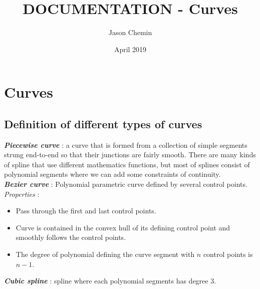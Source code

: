 \documentclass{article}
\title{DOCUMENTATION - Curves}
\author{Jason Chemin}
\date{April 2019}
\begin{document}
\newcommand{\commentt}[2]{\textcolor{#1}{\textbf{\textit{[#2]}}}}       %
\newcommand{\nmnote}[1]{\commentt{red}{NM: #1}}
\newcommand{\stn}[1]{\commentt{blue}{ST: #1}}

\maketitle

\tableofcontents
\newpage

\section{Curves}
\subsection{Definition of different types of curves}


    \noindent
    \textbf{\textit{Piecewise curve}} : a curve that is formed from a collection of simple segments strung end-to-end so that their junctions are fairly smooth. There are many kinds of spline that use different mathematics functions, but most of splines consist of polynomial segments where we can add some constraints of continuity.\\

    \noindent
    \textbf{\textit{Bezier curve}} : Polynomial parametric curve defined by several control points. \textit{Properties} :
    \begin{itemize}
        \item Pass through the first and last control points.
        \item Curve is contained in the convex hull of its defining control point and smoothly follows the control points.
        \item The degree of polynomial defining the curve segment with $n$ control points is $n-1$.
    \end{itemize}

    \noindent
    \textbf{\textit{Cubic spline}} : spline where each polynomial segments has degree 3.\\
\end{document}
